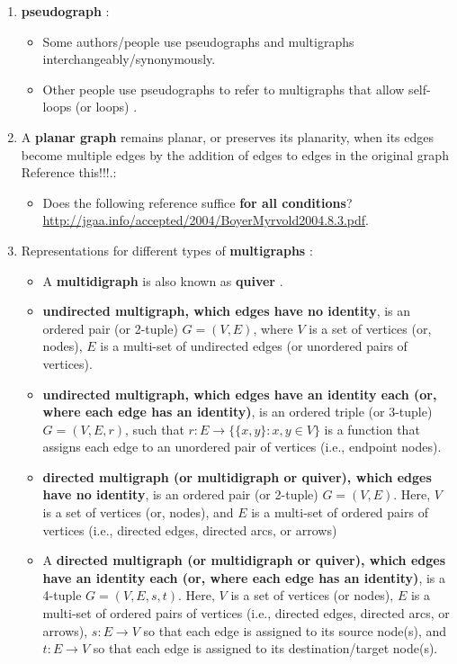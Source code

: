 \begin{enumerate}
\begin{enumerate}
\begin{enumerate}
		\item {\bf pseudograph} \cite{WikipediaContributors2018a39}: \vspace{-0.1cm}
			\begin{itemize} \itemsep -1pt
			\item Some authors/people use pseudographs and multigraphs interchangeably/synonymously.
			\item Other people use pseudographs to refer to multigraphs that allow self-loops \cite[\S B.4, pp. 1168]{Cormen2009} (or loops) \cite{WikipediaContributors2017a13}.
			\end{itemize}
		\item A {\bf planar graph} remains planar, or preserves its planarity, when its edges become multiple edges by the addition of edges to edges in the original graph {\Huge Reference this!!!}.: \vspace{-0.1cm}
			\begin{itemize} \itemsep -1pt
			\item Does the following reference suffice {\bf for all conditions}? \url{http://jgaa.info/accepted/2004/BoyerMyrvold2004.8.3.pdf}.
			\end{itemize}
		\item Representations for different types of {\bf multigraphs} \cite{WikipediaContributors2018a39}: \vspace{-0.1cm}
			\begin{itemize} \itemsep -1pt
			\item A {\bf multidigraph} is also known as {\bf quiver} \cite{WikipediaContributors2018a40}.
			\item {\bf undirected multigraph, which edges have no identity}, is an ordered pair (or 2-tuple) $G = (V, E)$, where $V$ is a set of vertices (or, nodes), $E$ is a multi-set of undirected edges (or unordered pairs of vertices).
			\item {\bf undirected multigraph, which edges have an identity each (or, where each edge has an identity)}, is an ordered triple (or 3-tuple) $G = (V, E, r)$, such that $r: E \rightarrow \{\{x, y\} : x, y \in V\}$ is a function that assigns each edge to an unordered pair of vertices (i.e., endpoint nodes).
			\item {\bf directed multigraph (or multidigraph or quiver), which edges have no identity}, is an ordered pair (or 2-tuple) $G = (V,E)$. Here, $V$ is a set of vertices (or, nodes), and $E$ is a multi-set of ordered pairs of vertices (i.e., directed edges, directed arcs, or arrows)
			\item A {\bf directed multigraph (or multidigraph or quiver), which edges have an identity each (or, where each edge has an identity)}, is a 4-tuple $G = (V, E, s, t)$. Here, $V$ is a set of vertices (or nodes), $E$ is a multi-set of ordered pairs of vertices (i.e., directed edges, directed arcs, or arrows), $s : E \rightarrow V$ so that each edge is assigned to its source node(s), and $t : E \rightarrow V$ so that each edge is assigned to its destination/target node(s).

\end{itemize}
\end{enumerate}
\end{enumerate}
\end{enumerate}
